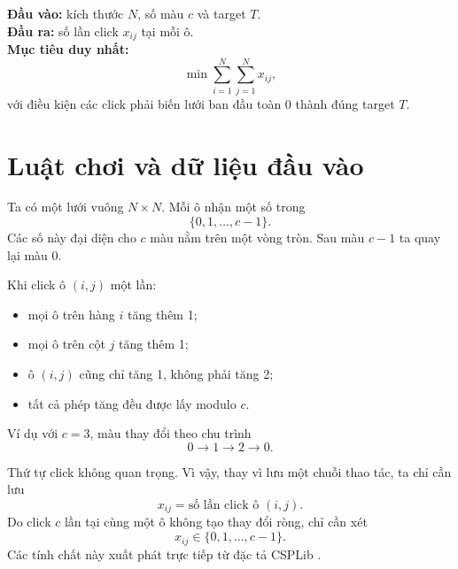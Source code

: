 \documentclass[11pt,a4paper]{article}
\begin{document}
\begin{abstract}
Tài liệu chỉ xét một mục tiêu: với trạng thái đích đã cho, tìm cách click
có tổng số lần click nhỏ nhất. Trạng thái ban đầu được lấy là lưới toàn 0,
đúng theo quy ước của CSPLib prob027. Trước tiên, một ví dụ
$4\times4$ với ba màu được giải từng bước. Sau đó cùng ví dụ này được dùng
để giải thích mô hình quy hoạch tuyến tính nguyên (ILP) và mô hình SAT có
cận chi phí. Phần cuối thiết kế một quy trình sinh benchmark tái lập, mô tả
các file dữ liệu trong dự án và dẫn nguồn paper/web.
\end{abstract}

\begin{summarybox}
\textbf{Đầu vào:} kích thước $N$, số màu $c$ và target $T$.\\
\textbf{Đầu ra:} số lần click $x_{ij}$ tại mỗi ô.\\
\textbf{Mục tiêu duy nhất:}
\[
  \min \sum_{i=1}^{N}\sum_{j=1}^{N}x_{ij},
\]
với điều kiện các click phải biến lưới ban đầu toàn 0 thành đúng target
$T$.
\end{summarybox}

\begingroup
\small
\setlength{\parskip}{0pt}
\tableofcontents
\endgroup
\clearpage
{}

\section{Luật chơi và dữ liệu đầu vào}\label{sec:problem}

Ta có một lưới vuông $N\times N$. Mỗi ô nhận một số trong
\[
  \{0,1,\ldots,c-1\}.
\]
Các số này đại diện cho $c$ màu nằm trên một vòng tròn. Sau màu $c-1$ ta
quay lại màu 0.

Khi click ô $(i,j)$ một lần:
\begin{itemize}
  \item mọi ô trên hàng $i$ tăng thêm 1;
  \item mọi ô trên cột $j$ tăng thêm 1;
  \item ô $(i,j)$ cũng chỉ tăng 1, không phải tăng 2;
  \item tất cả phép tăng đều được lấy modulo $c$.
\end{itemize}

Ví dụ với $c=3$, màu thay đổi theo chu trình
\[
  0\longrightarrow1\longrightarrow2\longrightarrow0.
\]

Thứ tự click không quan trọng. Vì vậy, thay vì lưu một chuỗi thao tác, ta
chỉ cần lưu
\[
  x_{ij}=\text{số lần click ô }(i,j).
\]
Do click $c$ lần tại cùng một ô không tạo thay đổi ròng, chỉ cần xét
\[
  x_{ij}\in\{0,1,\ldots,c-1\}.
\]
Các tính chất này xuất phát trực tiếp từ đặc tả CSPLib
\cite{csplib027,gent2000symmetry}.
\end{document}

